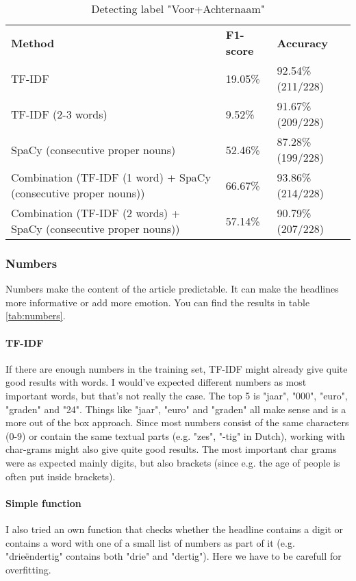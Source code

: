 \documentclass{article}
\begin{document}
\begin{table}[]
\begin{tabular}{lll}
\textbf{Method}                                                    & \textbf{F1-score} & \textbf{Accuracy} \\
TF-IDF                                                             & 19.05\%           & 92.54\% (211/228) \\
TF-IDF (2-3 words)                                                 & 9.52\%            & 91.67\% (209/228) \\
SpaCy (consecutive proper nouns)                                   & 52.46\%           & 87.28\% (199/228) \\
Combination (TF-IDF (1 word) + SpaCy  (consecutive proper nouns))  & 66.67\%           & 93.86\% (214/228) \\
Combination (TF-IDF (2 words) + SpaCy  (consecutive proper nouns)) & 57.14\%           & 90.79\% (207/228)
\end{tabular}
\caption{Detecting label "Voor+Achternaam"}
\label{tab:firstlast}
\end{table}

\subsubsection{Numbers}
Numbers make the content of the article predictable. It can make the headlines more informative or add more emotion. \cite{soubry} You can find the results in table \ref{tab:numbers}.

\paragraph{TF-IDF} If there are enough numbers in the training set, TF-IDF might already give quite good results with words. I would've expected different numbers as most important words, but that's not really the case. The top 5 is "jaar", "000", "euro", "graden" and "24". Things like "jaar", "euro" and "graden" all make sense and is a more out of the box approach. Since most numbers consist of the same characters (0-9) or contain the same textual parts (e.g. "zes", "-tig" in Dutch), working with char-grams might also give quite good results. The most important char grams were as expected mainly digits, but also brackets (since e.g. the age of people is often put inside brackets).

\paragraph{Simple function} I also tried an own function that checks whether the headline contains a digit or contains a word with one of a small list of numbers as part of it (e.g. "drieëndertig" contains both "drie" and "dertig"). Here we have to be carefull for overfitting.
\end{document}
